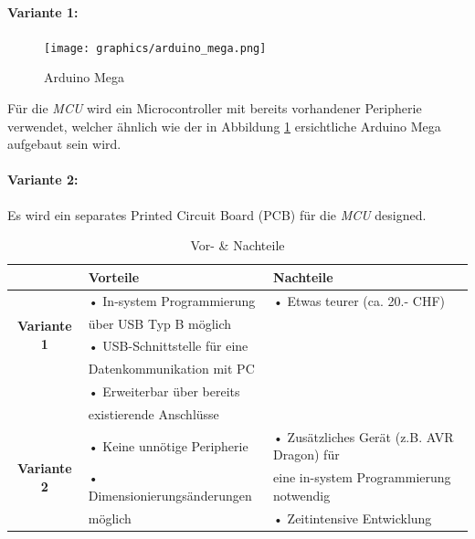 \paragraph{Variante 1:}
\begin{figure}
  \vspace{-10pt}
  \begin{center}
    \texttt{[image: graphics/arduino\_mega.png]}
  \end{center}
  \vspace{-10pt}
  \caption{Arduino Mega \cite{Elektronik}}
  \vspace{-10pt}
  \label{fig:arduino_mega}
\end{figure}
Für die \textit{MCU} wird ein Microcontroller mit bereits vorhandener Peripherie verwendet, welcher ähnlich wie der in Abbildung \ref{fig:arduino_mega} ersichtliche Arduino Mega aufgebaut sein wird.

\paragraph{Variante 2:}
Es wird ein separates Printed Circuit Board (PCB) für die \textit{MCU} designed.\\

\begin{table}[h]
  \centering
  \label{tab:mcu}
  \small
  \caption{Vor- \& Nachteile}
    \begin{tabular}{c|l|l}
          & \textbf{Vorteile} & \textbf{Nachteile} \\
    \toprule
    \multirow{4}[2]{*}{\textbf{Variante 1}} & • In-system Programmierung & • Etwas teurer (ca. 20.- CHF) \\
          & \hspace{0.3cm} über USB Typ B möglich &  \\
          & • USB-Schnittstelle für eine &  \\
          &   \hspace{0.3cm} Datenkommunikation mit PC &  \\
          & • Erweiterbar über bereits  &  \\
          &   \hspace{0.3cm} existierende Anschlüsse &  \\
    \hline
    \multirow{3}[1]{*}{\textbf{Variante 2}} & • Keine unnötige Peripherie & • Zusätzliches Gerät (z.B. AVR Dragon) für \\
          & • Dimensionierungsänderungen & \hspace{0.3cm} eine in-system Programmierung notwendig \\
          & \hspace{0.3cm} möglich & • Zeitintensive Entwicklung\\
    \end{tabular}%
  \label{tab:mcu}%
\end{table}%

